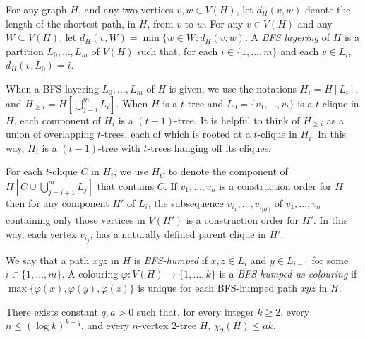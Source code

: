 \documentclass[kpfonts]{patmorin}
\newcommand{\uqs}{\chi_2}
\begin{document}
For any graph $H$, and any two vertices $v,w\in V(H)$, let $d_H(v,w)$ denote the length of the shortest path, in $H$, from $v$ to $w$. For any $v\in V(H)$ and any $W\subseteq V(H)$, let $d_H(v,W)=\min\{w\in W: d_H(v,w)$. A \emph{BFS layering} of $H$ is a partition $L_0,\ldots,L_m$ of $V(H)$ such that, for each $i\in\{1,\ldots,m\}$ and each $v\in L_i$, $d_H(v,L_0)=i$.

When a BFS layering $L_0,\ldots,L_m$ of $H$ is given, we use the notations $H_i=H[L_i]$, and $H_{\ge i}=H[\bigcup_{j=i}^m L_i]$.  When $H$ is a $t$-tree and $L_0=\{v_1,\ldots,v_t\}$ is a $t$-clique in $H$, each component of $H_i$ is a $(t-1)$-tree.  It is helpful to think of $H_{\ge i}$ as a union of overlapping $t$-trees, each of which is rooted at a $t$-clique in $H_i$. In this way, $H_i$ is a $(t-1)$-tree with $t$-trees hanging off its cliques.

For each $t$-clique $C$ in $H_i$, we use $H_C$ to denote the component of $H[C\cup\bigcup_{j=i+1}^m L_j]$ that contains $C$.  If $v_1,\ldots,v_n$ is a construction order for $H$ then for any component $H'$ of $L_i$, the subsequence $v_{i_1},\ldots,v_{i_|H'|}$ of $v_1,\ldots,v_n$ containing only those vertices in $V(H')$ is a construction order for $H'$.  In this way, each vertex $v_{i_j}$, has a naturally defined parent clique in $H'$.

We say that a path $xyz$ in $H$ is \emph{BFS-humped} if $x,z\in L_i$ and $y\in L_{i-1}$ for some $i\in\{1,\ldots,m\}$.  A colouring $\varphi:V(H)\to\{1,\ldots,k\}$ is a \emph{BFS-humped us-colouring} if $\max\{\varphi(x),\varphi(y),\varphi(z)\}$ is unique for each BFS-humped path $xyz$ in $H$.



\begin{thm}\label{two-tree-technical}
    There exists constant $q,a>0$ such that, for every integer $k\ge 2$, every $n\le (\log k)^{k-q}$, and every $n$-vertex 2-tree $H$, $\uqs(H)\le ak$.
\end{thm}
\end{document}
